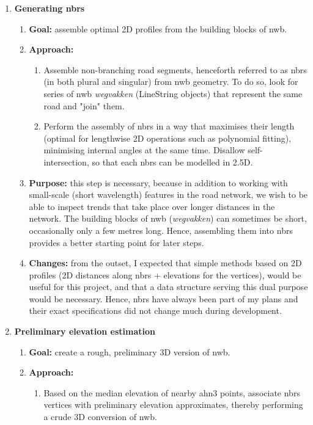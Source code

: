 \begin{enumerate}
    \item \textbf{Generating \ac{nbrs}}
    \begin{enumerate}
        \item \textbf{Goal:} assemble optimal 2D profiles from the building blocks of \ac{nwb}.
        \item \textbf{Approach:}
        \begin{enumerate}
            \item Assemble non-branching road segments, henceforth referred to as \ac{nbrs} (in both plural and singular) from \ac{nwb} geometry. To do so, look for series of \ac{nwb} \textit{wegvakken} (LineString objects) that represent the same road and "join" them.
            \item Perform the assembly of \ac{nbrs} in a way that maximises their length (optimal for lengthwise 2D operations such as polynomial fitting), minimising internal angles at the same time. Disallow self-intersection, so that each \ac{nbrs} can be modelled in 2.5D.
        \end{enumerate}
        \item \textbf{Purpose:} this step is necessary, because in addition to working with small-scale (short wavelength) features in the road network, we wish to be able to inspect trends that take place over longer distances in the network. The building blocks of \ac{nwb} (\textit{wegvakken}) can sometimes be short, occasionally only a few metres long. Hence, assembling them into \ac{nbrs} provides a better starting point for later steps.
        \item \textbf{Changes:} from the outset, I expected that simple methods based on 2D profiles (2D distances along \ac{nbrs} + elevations for the vertices), would be useful for this project, and that a data structure serving this dual purpose would be necessary. Hence, \ac{nbrs} have always been part of my plans and their exact specifications did not change much during development.
    \end{enumerate}
    \item \textbf{Preliminary elevation estimation}
    \begin{enumerate}
        \item \textbf{Goal:} create a rough, preliminary 3D version of \ac{nwb}.
        \item \textbf{Approach:}
        \begin{enumerate}
            \item Based on the median elevation of nearby \ac{ahn3} points, associate \ac{nbrs} vertices with preliminary elevation approximates, thereby performing a crude 3D conversion of \ac{nwb}.

\end{enumerate}
\end{enumerate}
\end{enumerate}
